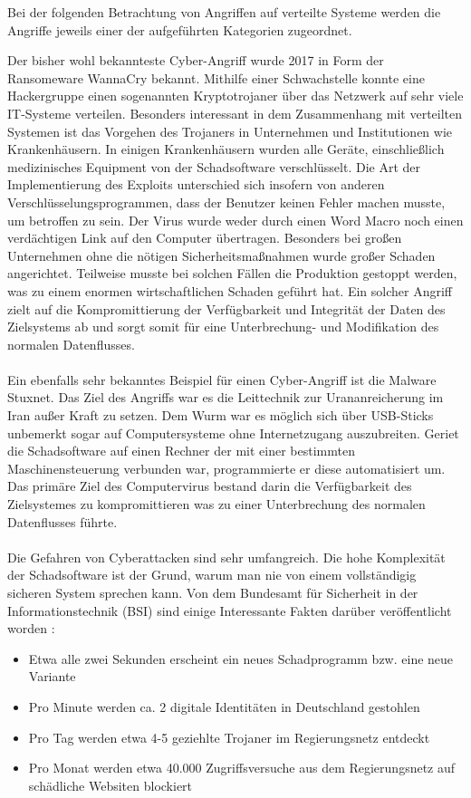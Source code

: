 \documentclass[utf8,biblatex]{lni}
\begin{document}
Bei der folgenden Betrachtung von Angriffen auf verteilte Systeme werden die Angriffe jeweils einer 
der aufgeführten Kategorien zugeordnet. 

Der bisher wohl bekannteste Cyber-Angriff wurde 2017 in Form der Ransomeware \glqq WannaCry\grqq{} bekannt.
Mithilfe einer Schwachstelle konnte eine Hackergruppe einen sogenannten Kryptotrojaner über das Netzwerk
auf sehr viele IT-Systeme verteilen. Besonders interessant in dem Zusammenhang mit verteilten Systemen ist 
das Vorgehen des Trojaners in Unternehmen und Institutionen wie Krankenhäusern. 
In einigen Krankenhäusern wurden alle Geräte, einschließlich medizinisches Equipment von 
der Schadsoftware verschlüsselt. 
Die Art der Implementierung des Exploits unterschied sich insofern von anderen Verschlüsselungsprogrammen, 
dass der Benutzer keinen Fehler machen musste, um betroffen zu sein. 
Der Virus wurde weder durch einen Word Macro noch einen verdächtigen Link auf den Computer übertragen. 
Besonders bei großen Unternehmen ohne die nötigen Sicherheitsmaßnahmen wurde großer Schaden angerichtet. 
Teilweise musste bei solchen Fällen die Produktion gestoppt werden, was zu einem enormen wirtschaftlichen 
Schaden geführt hat. 
Ein solcher Angriff zielt auf die Kompromittierung der Verfügbarkeit und Integrität der Daten des 
Zielsystems ab und sorgt somit für eine Unterbrechung- und Modifikation des normalen Datenflusses. 
\\\\
Ein ebenfalls sehr bekanntes Beispiel für einen Cyber-Angriff ist die Malware \glqq Stuxnet\grqq{}.
Das Ziel des Angriffs war es die Leittechnik zur Urananreicherung im Iran außer Kraft zu setzen. 
Dem Wurm war es möglich sich über USB-Sticks unbemerkt sogar auf Computersysteme ohne Internetzugang 
auszubreiten. Geriet die Schadsoftware auf einen Rechner der mit einer bestimmten Maschinensteuerung 
verbunden war, programmierte er diese automatisiert um. Das primäre Ziel des Computervirus bestand darin 
die Verfügbarkeit des Zielsystemes zu kompromittieren was zu einer Unterbrechung des normalen Datenflusses führte. 
\\\\
Die Gefahren von Cyberattacken sind sehr umfangreich. Die hohe Komplexität der Schadsoftware ist der 
Grund, warum man nie von einem vollständigig sicheren System sprechen kann. 
Von dem Bundesamt für Sicherheit in der Informationstechnik (BSI) sind einige Interessante Fakten darüber veröffentlicht worden \cite{o.A.2012}: 
\begin{itemize}
    \item Etwa alle zwei Sekunden erscheint ein neues Schadprogramm bzw. eine neue Variante
    \item Pro Minute werden ca. 2 digitale Identitäten in Deutschland gestohlen
    \item Pro Tag werden etwa 4-5 geziehlte Trojaner im Regierungsnetz entdeckt
    \item Pro Monat werden etwa 40.000 Zugriffsversuche aus dem Regierungsnetz auf schädliche Websiten blockiert
\end{itemize}
\end{document}
